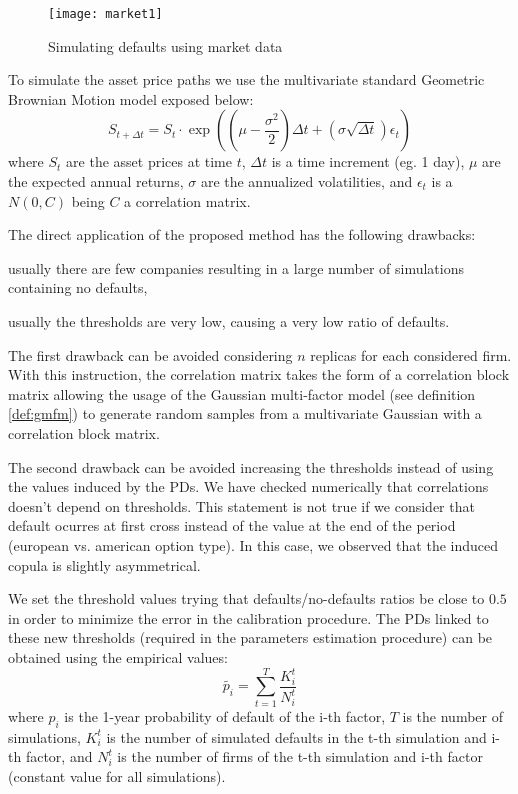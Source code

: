 \documentclass[11pt,fleqn]{book} %
\begin{document}
\begin{figure}[!ht]
	\centering
	\texttt{[image: market1]}
	\caption{Simulating defaults using market data}
	\label{fig:market1}
\end{figure}

To simulate the asset price paths we use the multivariate standard Geometric 
Brownian Motion model exposed below:
\begin{displaymath}
	S_{t+\Delta t} = S_t \cdot \exp\left(
	\left(\mu - \frac{\sigma^2}{2}\right) \Delta t +
	\left(\sigma \sqrt{\Delta t}\right) \epsilon_t
	\right)
\end{displaymath}
where $S_t$ are the asset prices at time $t$, $\Delta t$ is a time increment
(eg. 1 day), $\mu$ are the expected annual returns, $\sigma$ are the annualized 
volatilities, and $\epsilon_t$ is a $N(0,C)$ being $C$ a correlation matrix.

The direct application of the proposed method has the following drawbacks: 
\begin{inparaenum}[1)]
	\item usually there are few companies resulting in a large number of 
	simulations containing no defaults,
	\item usually the thresholds are very low, causing a very low ratio of 
	defaults.
\end{inparaenum}

The first drawback can be avoided considering $n$ replicas for each considered
firm. With this instruction, the correlation matrix takes the form of a 
correlation block matrix allowing the usage of the Gaussian multi-factor model
(see definition \ref{def:gmfm}) to generate random samples from a multivariate 
Gaussian with a correlation block matrix.

The second drawback can be avoided increasing the thresholds instead of using
the values induced by the PDs. We have checked numerically that correlations 
doesn't depend on thresholds. This statement is not true if we consider that
default ocurres at first cross instead of the value at the end of the period 
(european vs. american option type). In this case, we observed that the induced
copula is slightly asymmetrical.

We set the threshold values trying that defaults/no-defaults ratios be close 
to $0.5$ in order to minimize the error in the calibration procedure. The PDs 
linked to these new thresholds (required in the parameters estimation procedure) 
can be obtained using the empirical values:
\begin{displaymath}
	\tilde{p_i} = \sum_{t=1}^{T} \frac{K_i^t}{N_i^t}
\end{displaymath}
where $p_i$ is the 1-year probability of default of the i-th factor, $T$ is the
number of simulations, $K_i^t$ is the number of simulated defaults in the
t-th simulation and i-th factor, and $N_i^t$ is the number of firms of the t-th 
simulation and i-th factor (constant value for all simulations).
\end{document}
